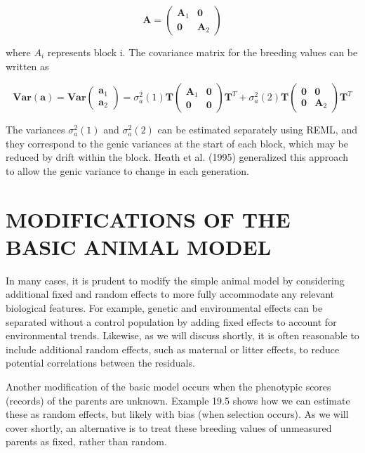\documentclass{article}
\begin{document}
\begin{equation}
\boldsymbol{A}=\left(\begin{array}{cc}\boldsymbol{A}_{1}&\mathbf{0}\\\mathbf{0}&\boldsymbol{A}_{2}\end{array}\right)
\end{equation}

where  $ A_{i} $ represents block i. The covariance matrix for the breeding values can be written as

\begin{equation}
\mathbf{V a r}(\mathbf{a})=\mathbf{V a r}\begin{pmatrix}\mathbf{a}_{1}\\ \mathbf{a}_{2}\end{pmatrix}=\sigma_{a}^{2}(1)\mathbf{T}\begin{pmatrix}\boldsymbol{A}_{1}&\mathbf{0}\\ \mathbf{0}&\mathbf{0}\end{pmatrix}\mathbf{T}^{T}+\sigma_{a}^{2}(2)\mathbf{T}\begin{pmatrix}\mathbf{0}&\mathbf{0}\\ \mathbf{0}&\boldsymbol{A}_{2}\end{pmatrix}\mathbf{T}^{T}
\tag{19.19}
\label{eq:19_19}
\end{equation}

The variances  $ \sigma_a^2(1) $ and  $ \sigma_a^2(2) $ can be estimated separately using REML, and they correspond to the genic variances at the start of each block, which may be reduced by drift within the block. Heath et al. (1995) generalized this approach to allow the genic variance to change in each generation.

\section{MODIFICATIONS OF THE BASIC ANIMAL MODEL}
In many cases, it is prudent to modify the simple animal model by considering additional fixed and random effects to more fully accommodate any relevant biological features. For example, genetic and environmental effects can be separated without a control population by adding fixed effects to account for environmental trends. Likewise, as we will discuss shortly, it is often reasonable to include additional random effects, such as maternal or litter effects, to reduce potential correlations between the residuals.

Another modification of the basic model occurs when the phenotypic scores (records) of the parents are unknown. Example 19.5 shows how we can estimate these as random effects, but likely with bias (when selection occurs). As we will cover shortly, an alternative is to treat these breeding values of unmeasured parents as fixed, rather than random.
\end{document}
